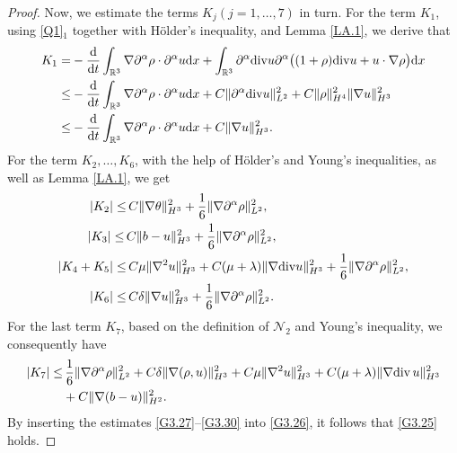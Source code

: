 \documentclass[reqno,11pt]{amsart}
\theoremstyle{plain}
\numberwithin{equation}{section}
\begin{document}
\begin{proof}
Now, we estimate the terms $K_j(j=1, \dots, 7)$ in turn. For the term $K_1$, 
using \eqref{Q1}$_1$ together with H\"{o}lder's inequality, and Lemma \ref{LA.1}, we derive that 
\begin{align}\label{G3.27}
K_1= & -\frac{\mathrm{d}}{\mathrm{d} t} \int_{\mathbb{R}^3} \nabla \partial^\alpha \rho \cdot\partial^\alpha u \mathrm{d} x+\int_{\mathbb{R}^3} \partial^\alpha {\rm div}  u \partial^\alpha\big((1+\rho) {\rm div}  u+u \cdot \nabla \rho\big) \mathrm{d} x \nonumber\\
\leq& -\frac{\mathrm{d}}{\mathrm{d} t} \int_{\mathbb{R}^3} \nabla \partial^\alpha \rho\cdot \partial^\alpha u \mathrm{d} x+C\|\partial^\alpha {\rm div}  u \|_{L^2}^2+C\|\rho\|_{H^4}^2\|\nabla u\|_{H^3}^2\nonumber\\
\leq&  -\frac{\mathrm{d}}{\mathrm{d} t} \int_{\mathbb{R}^3} \nabla \partial^\alpha  \rho \cdot\partial^\alpha u \mathrm{d} x+C\|\nabla u\|_{H^3}^2.
\end{align}
 For the term $K_2, \dots, K_6$, with the help of H\"{o}lder's and Young's inequalities, as well as Lemma \ref{LA.1}, we get
\begin{align}%
|K_2|\leq&\, C\|\nabla\theta\|_{H^3}^2+ \frac{1}{6}\|\nabla \partial^\alpha \rho\|_{L^2}^2, 
\label{G3.28-1}\\
   |K_3|\leq \,& C\| b-u\|_{H^3}^2+ \frac{1}{6}\|\nabla \partial^\alpha \rho\|_{L^2}^2,  \label{G3.28-2}\\
|K_4+K_5|\leq&\,C\mu\|\nabla^2 u \|_{H^3}^2+ C(\mu+\lambda)\|\nabla {\rm div} u \|_{H^3}^2+ \frac{1}{6}\|\nabla \partial^\alpha \rho\|_{L^2}^2, \label{G3.28} \\
|K_6|\leq&\, C\delta \|\nabla u \|_{H^3}^2+  \frac{1}{6}\|\nabla \partial^\alpha \rho\|_{L^2}^2. \label{G3.29}
\end{align}
For the last term $K_7$, based on the definition of $\mathcal{N}_2$ and Young's inequality, we consequently have  \begin{align}\label{G3.30}
|K_7|\leq&\, \frac{1}{6}\|\nabla \partial^\alpha \rho\|_{L^2}^2+C\delta\|\nabla (\rho,u)\|_{H^3}^2+  C\mu\|\nabla^2 u \|_{H^3}^2+ C(\mu+\lambda)\|\nabla {\rm div}\, u \|_{H^3}^2 \nonumber\\
&+C\|\nabla(b-u)\|_{H^2}^2.
\end{align} 
By inserting the estimates \eqref{G3.27}--\eqref{G3.30} into \eqref{G3.26}, it follows that \eqref{G3.25} holds. 
 \end{proof}
\end{document}
